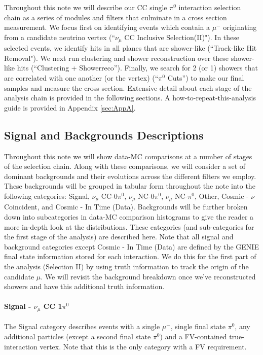 \documentclass{article}
\begin{document}
Throughout this note we will describe our CC single $\pi^0$ interaction selection chain as a series of modules and filters that culminate in a cross section measurement.  We focus first on identifying events which contain a $\mu^-$ originating from a candidate neutrino vertex (``$\nu_\mu$ CC Inclusive Selection(II)"). In these selected events, we identify hits in all planes that are shower-like (``Track-like Hit Removal"). We next run clustering and shower reconstruction over these shower-like hits (``Clustering + Showerreco'').  Finally, we search for 2 (or 1) showers that are correlated with one another (or the vertex) (``$\pi^0$ Cuts'') to make our final samples and measure the cross section. Extensive detail about each stage of the analysis chain is provided in the following sections.  A how-to-repeat-this-analysis guide is provided in Appendix \ref{sec:AppA}.

\subsection{Signal and Backgrounds Descriptions}
Throughout this note we will show data-MC comparisons at a number of stages of the selection chain.  Along with these comparisons, we will consider a set of dominant backgrounds and their evolutions across the different filters we employ. These backgrounds will be grouped in tabular form throughout the note into the following categories: Signal, $\nu_\mu$ CC-0$\pi^0$, $\nu_\mu$ NC-0$\pi^0$, $\nu_\mu$ NC-$\pi^0$, Other, Cosmic - $\nu$ Coincident, and Cosmic - In Time (Data). Backgrounds will be further broken down into subcategories in data-MC comparison histograms to give the reader a more in-depth look at the distributions.  These categories (and sub-categories for the first stage of the analysis) are described here. Note that all signal and background categories except Cosmic - In Time (Data) are defined by the GENIE final state information stored for each interaction. We do this for the first part of the analysis (Selection II) by using truth information to track the origin of the candidate $\mu$. We will revisit the background breakdown once we've reconstructed showers and have this additional truth information.

\paragraph{Signal - $\nu_\mu$ CC 1$\pi^0$} The Signal category describes events with a single $\mu^-$, single final state $\pi^0$, any additional particles (except a second final state $\pi^0$) and a FV-contained true-interaction vertex.  Note that this is the only category with a FV requirement.
\end{document}
